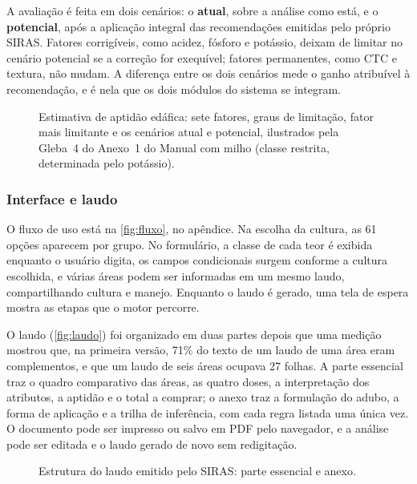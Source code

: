 A avaliação é feita em dois cenários: o \textbf{atual}, sobre a análise como está, e o
\textbf{potencial}, após a aplicação integral das recomendações emitidas pelo próprio SIRAS.
Fatores corrigíveis, como acidez, fósforo e potássio, deixam de limitar no cenário potencial se a
correção for exequível; fatores permanentes, como CTC e textura, não mudam. A diferença entre os
dois cenários mede o ganho atribuível à recomendação, e é nela que os dois módulos do sistema se
integram.

\begin{figure}[!tbp]
\centering
{}
\caption{Estimativa de aptidão edáfica: sete fatores, graus de limitação, fator mais limitante e
os cenários atual e potencial, ilustrados pela Gleba~4 do Anexo~1 do Manual com milho (classe
restrita, determinada pelo potássio).}
\label{fig:aptidao}
\end{figure}

\subsubsection{Interface e laudo}

O fluxo de uso está na \autoref{fig:fluxo}, no apêndice. Na escolha da cultura, as 61 opções aparecem por grupo. No
formulário, a classe de cada teor é exibida enquanto o usuário digita, os campos condicionais
surgem conforme a cultura escolhida, e várias áreas podem ser informadas em um mesmo laudo,
compartilhando cultura e manejo. Enquanto o laudo é gerado, uma tela de espera mostra as etapas
que o motor percorre.

O laudo (\autoref{fig:laudo}) foi organizado em duas partes depois que uma medição mostrou que,
na primeira versão, 71\% do texto de um laudo de uma área eram complementos, e que um laudo de seis
áreas ocupava 27 folhas. A parte essencial traz o quadro comparativo das áreas, as quatro doses,
a interpretação dos atributos, a aptidão e o total a comprar; o anexo traz a formulação do adubo,
a forma de aplicação e a trilha de inferência, com cada regra listada uma única vez. O documento
pode ser impresso ou salvo em PDF pelo navegador, e a análise pode ser editada e o laudo gerado
de novo sem redigitação.

\begin{figure}[!tbp]
\centering
{}
\caption{Estrutura do laudo emitido pelo SIRAS: parte essencial e anexo.}
\label{fig:laudo}
\end{figure}
